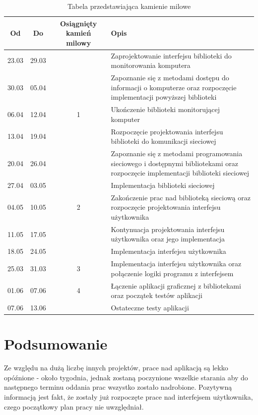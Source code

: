 \documentclass[a4paper]{article}
\begin{document}
		\begin{table}[h]
			\centering
			\begin{tabularx}{0.8\textwidth}{|c|c|c|X|}
				\hline
				Od & Do & Osiągnięty kamień milowy & Opis \\ \hline
				23.03 & 29.03 &  & Zaprojektowanie interfejsu biblioteki do monitorowania komputera \\ \hline
				30.03 & 05.04 &  & Zapoznanie się z metodami dostępu do informacji o komputerze oraz rozpoczęcie implementacji powyższej biblioteki\\ \hline
				06.04 & 12.04 & 1 & Ukończenie biblioteki monitorującej komputer  \\ \hline
				13.04 & 19.04 &   & Rozpoczęcie projektowania interfejsu biblioteki do komunikacji sieciowej \\ \hline
				20.04 & 26.04 &  & Zapoznanie się z metodami programowania sieciowego i dostępnymi bibliotekami oraz  rozpoczęcie implementacji biblioteki sieciowej\\ \hline
				27.04 & 03.05 &  & Implementacja biblioteki sieciowej \\ \hline
				04.05 & 10.05 & 2 & Zakończenie prac nad biblioteką sieciową oraz rozpoczęcie projektowania interfejsu użytkownika \\ \hline
				11.05 & 17.05 &    & Kontynuacja projektowania interfejsu użytkownika oraz jego implementacja \\ \hline
				18.05 & 24.05 &  & Implementacja interfejsu użytkownika \\ \hline
				25.03 & 31.03 & 3 & Implementacja interfejsu użytkownika oraz połączenie logiki programu z interfejsem \\ \hline
				01.06 & 07.06 & 4 & Łączenie aplikacji graficznej z bibliotekami oraz początek testów aplikacji \\ \hline
				07.06 & 13.06 &  & Ostateczne testy aplikacji \\ \hline
			\end{tabularx}
			\caption{Tabela przedstawiająca kamienie milowe}
			\label{tabela_harmonogram_stary}
		\end{table}

\section{Podsumowanie}
Ze względu na dużą liczbę innych projektów, prace nad aplikacją są lekko opóźnione - około tygodnia, jednak zostaną poczynione wszelkie starania aby do następnego terminu oddania prac wszystko zostało nadrobione. 
Pozytywną informacją jest fakt, że zostały już rozpoczęte prace nad interfejsem użytkownika, czego początkowy plan pracy nie uwzględniał.
\end{document}

